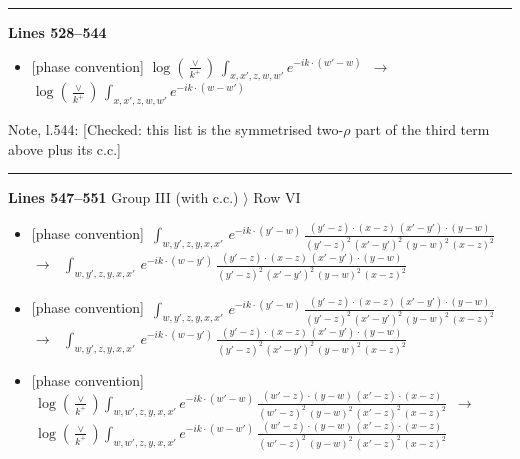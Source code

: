 \documentclass[10pt]{article}
\newenvironment{notebox}{\def\FrameCommand{{\color{notebar}\vrule width 1.5pt}\hspace{6pt}}\MakeFramed{\advance\hsize-\width\FrameRestore}\small}{\endMakeFramed}
\begin{document}
\noindent\rule{\linewidth}{0.3pt}\par\noindent\textbf{Lines 528--544} \par
\begin{itemize}[leftmargin=2.2em,itemsep=1pt,topsep=2pt]
\item[\textbf{l.528}] \textsf{\small [phase convention]} $\displaystyle \log{(\frac{\vee}{k^{+}})}\, \int_{x,x',z,w,w'}e^{-ik\cdot(w'-w)}$\ $\longrightarrow$\ $\displaystyle \log{(\frac{\vee}{k^{+}})}\, \int_{x,x',z,w,w'}e^{-ik\cdot(w-w')}$
\end{itemize}
\begin{notebox}\textsf{\small Note, l.544:} [Checked: this list is the symmetrised two-$\rho$ part of the third term above plus its c.c.]\end{notebox}
\noindent\rule{\linewidth}{0.3pt}\par\noindent\textbf{Lines 547--551} \quad \textsf{Group III (with c.c.) $\rangle$ Row VI} \par
\begin{itemize}[leftmargin=2.2em,itemsep=1pt,topsep=2pt]
\item[\textbf{l.547}] \textsf{\small [phase convention]} $\displaystyle \, \int_{w,y',z,y,x,x'}\, e^{-ik\cdot (y'-w)}\,\frac{(y'-z)\cdot (x-z)\,(x'-y')\cdot (y-w)}{(y'-z)^{2}\,(x'-y')^{2}\,(y-w)^{2}\,(x-z)^{2}}$\ $\longrightarrow$\ $\displaystyle \, \int_{w,y',z,y,x,x'}\, e^{-ik\cdot (w-y')}\,\frac{(y'-z)\cdot (x-z)\,(x'-y')\cdot (y-w)}{(y'-z)^{2}\,(x'-y')^{2}\,(y-w)^{2}\,(x-z)^{2}}$
\item[\textbf{l.548}] \textsf{\small [phase convention]} $\displaystyle \, \int_{w,y',z,y,x,x'}\, e^{-ik\cdot (y'-w)}\,\frac{(y'-z)\cdot (x-z)\,(x'-y')\cdot (y-w)}{(y'-z)^{2}\,(x'-y')^{2}\,(y-w)^{2}\,(x-z)^{2}}$\ $\longrightarrow$\ $\displaystyle \, \int_{w,y',z,y,x,x'}\, e^{-ik\cdot (w-y')}\,\frac{(y'-z)\cdot (x-z)\,(x'-y')\cdot (y-w)}{(y'-z)^{2}\,(x'-y')^{2}\,(y-w)^{2}\,(x-z)^{2}}$
\item[\textbf{l.549}] \textsf{\small [phase convention]} $\displaystyle \,\log{(\frac{\vee}{k^{+}})}\int_{w,w',z,y,x,x'} e^{-ik\cdot (w'-w)}\,\frac{(w'-z)\cdot (y-w)\,(x'-z)\cdot (x-z)}{(w'-z)^{2}\,(y-w)^{2}\,(x'-z)^{2}\,(x-z)^{2}}$\ $\longrightarrow$\ $\displaystyle \,\log{(\frac{\vee}{k^{+}})}\int_{w,w',z,y,x,x'} e^{-ik\cdot (w-w')}\,\frac{(w'-z)\cdot (y-w)\,(x'-z)\cdot (x-z)}{(w'-z)^{2}\,(y-w)^{2}\,(x'-z)^{2}\,(x-z)^{2}}$
\end{itemize}
\end{document}
